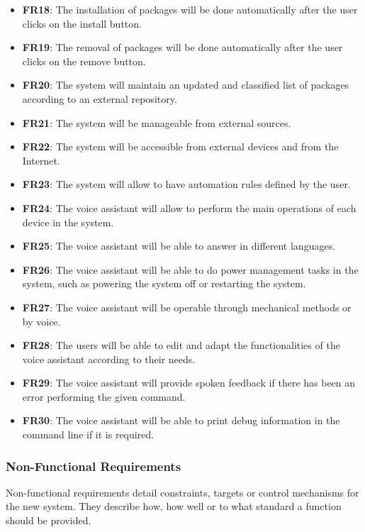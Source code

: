 \begin{itemize}
	\item \textbf{FR18}: The installation of packages will be done automatically after the user clicks on the install button.
	\item \textbf{FR19}: The removal of packages will be done automatically after the user clicks on the remove button.
	\item \textbf{FR20}: The system will maintain an updated and classified list of packages according to an external repository.
	\item \textbf{FR21}: The system will be manageable from external sources.
	\item \textbf{FR22}: The system will be accessible from external devices and from the Internet.
	\item \textbf{FR23}: The system will allow to have automation rules defined by the user.
	\item \textbf{FR24}: The voice assistant will allow to perform the main operations of each device in the system.
	\item \textbf{FR25}: The voice assistant will be able to answer in different languages.
	\item \textbf{FR26}: The voice assistant will be able to do power management tasks in the system, such as powering the system
	off or restarting the system.
	\item \textbf{FR27}: The voice assistant will be operable through mechanical methods or by voice.
	\item \textbf{FR28}: The users will be able to edit and adapt the functionalities of the voice assistant according to their needs.
	\item \textbf{FR29}: The voice assistant will provide spoken feedback if there has been an error performing the given command.
	\item \textbf{FR30}: The voice assistant will be able to print debug information in the command line if it is required.
\end{itemize}

\subsubsection{Non-Functional Requirements}
Non-functional requirements detail constraints, targets or control mechanisms for the new system. They describe how, how well or
to what standard a function should be provided.\cite{sqaFunctionalNonFunctional}

